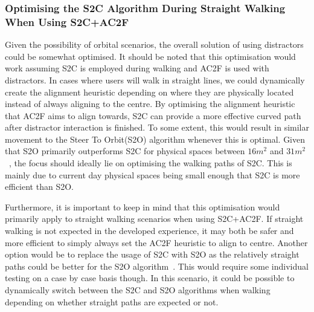 \subsubsection{Optimising the S2C Algorithm During Straight Walking When Using S2C+AC2F}
Given the possibility of orbital scenarios, the overall solution of using distractors could be somewhat optimised. It should be noted that this optimisation would work assuming S2C is employed during walking and AC2F is used with distractors. In cases where users will walk in straight lines, we could dynamically create the alignment heuristic depending on where they are physically located instead of always aligning to the centre. By optimising the alignment heuristic that AC2F aims to align towards, S2C can provide a more effective curved path after distractor interaction is finished. To some extent, this would result in similar movement to the Steer To Orbit(S2O) algorithm whenever this is optimal. Given that S2O primarily outperforms S2C for physical spaces between $16m^2$ and $31m^2$~\cite{azmandian2015physical}, the focus should ideally lie on optimising the walking paths of S2C. This is mainly due to current day physical spaces being small enough that S2C is more efficient than S2O.   

Furthermore, it is important to keep in mind that this optimisation would primarily apply to straight walking scenarios when using S2C+AC2F. If straight walking is not expected in the developed experience, it may both be safer and more efficient to simply always set the AC2F heuristic to align to centre. Another option would be to replace the usage of S2C with S2O as the relatively straight paths could be better for the S2O algorithm~\cite{hodgson2013comparing}. This would require some individual testing on a case by case basis though. In this scenario, it could be possible to dynamically switch between the S2C and S2O algorithms when walking depending on whether straight paths are expected or not. 

